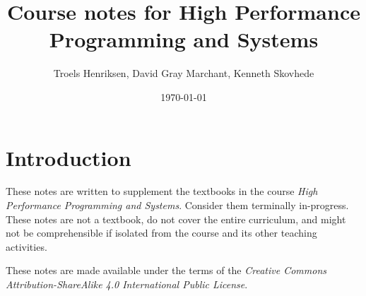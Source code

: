 \documentclass[oneside]{memoir}
\title{Course notes for High Performance Programming and Systems}
\author{Troels Henriksen, David Gray Marchant, Kenneth Skovhede} \date{\today}
\begin{document}
\maketitle

\section{Introduction}

These notes are written to supplement the textbooks in the course
\textit{High Performance Programming and Systems}.  Consider them
terminally in-progress.  These notes are not a textbook, do not cover
the entire curriculum, and might not be comprehensible if isolated
from the course and its other teaching activities.

These notes are made available under the terms of the \emph{Creative
  Commons Attribution-ShareAlike 4.0 International Public License}.

\newpage
\tableofcontents



















\newpage



\end{document}
